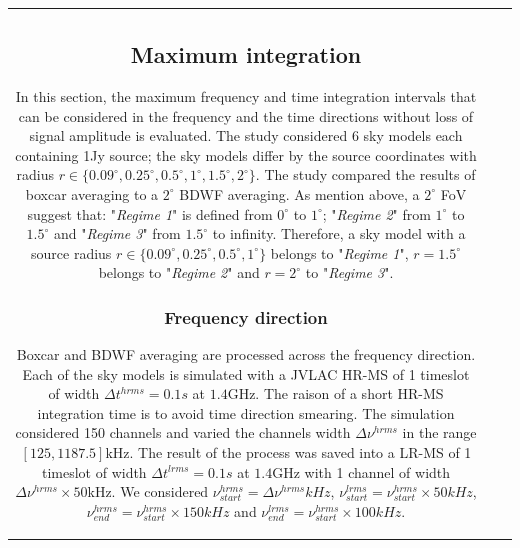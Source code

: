 \documentclass[useAMS,usenatbib]{mn2e}
\begin{document}
\begin{tabular}{*3{c}}
\subsection{Maximum integration}
In this section, the maximum frequency and time integration intervals  that can be 
considered in the frequency and the time 
directions without loss of signal amplitude is evaluated. The study considered $6$ sky 
models each  containing 1Jy source; the sky models differ by the source 
coordinates with radius $r\in\{0.09^\circ,0.25^\circ,0.5^\circ,1^\circ,1.5^\circ, 2^\circ\}$. The study compared the results of  boxcar 
averaging to a $2^\circ$ BDWF averaging. As mention above, a $2^{\circ}$ FoV suggest that: "\textit{Regime 1}" 
is defined from $0^\circ$ to $1^\circ$; "\textit{Regime 2}" from $1^\circ$ to $1.5^\circ$ and "\textit{Regime 3}" from $1.5^\circ$ to 
infinity. Therefore, a sky model with a source radius $r\in\{0.09^\circ,0.25^\circ,0.5^\circ,1^\circ\}$ belongs to "\textit{Regime 1}", 
$r= 1.5^\circ$ belongs to  "\textit{Regime 2}" and $r=2^\circ$ to "\textit{Regime 3}".
\subsubsection{Frequency direction}
Boxcar and BDWF averaging are processed across the frequency direction.
Each of the sky models is simulated with a JVLAC HR-MS of 1 timeslot of width $\Delta t^{hrms}=0.1s$ at $1.4$GHz. The raison of a short 
HR-MS 
integration time is to avoid time direction smearing. The simulation considered 150 channels and varied the channels width $\Delta 
\nu^{hrms}$ in the range $[125,1187.5]$kHz. The result of the process was saved into a LR-MS of 1 timeslot of width $\Delta 
t^{lrms}=0.1s$ at $1.4$GHz with 1 
channel of width $\Delta \nu^{hrms}\times50$kHz. We considered $\nu^{hrms}_{start}=\Delta \nu^{hrms}kHz$, 
$\nu^{lrms}_{start}=\nu^{hrms}_{start}\times50 kHz$, $\nu^{hrms}_{end}=\nu^{hrms}_{start}\times150 kHz$ and 
$\nu^{lrms}_{end}=\nu^{hrms}_{start}\times100 kHz$.


\end{tabular}
\end{document}
